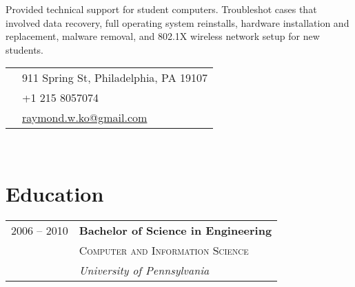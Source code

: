\documentclass[10pt]{article} %
\begin{document}
{\begin{minipage}[t]{0.5\textwidth}
\normalsize{Provided technical support for student computers. Troubleshot cases that involved data recovery, full operating system reinstalls, hardware installation and replacement, malware removal, and 802.1X wireless network setup for new students.}\\


\end{minipage} %
\hfill
\begin{minipage}[t]{0.44\textwidth} %
\vspace{0pt} %


\colorbox{shade}{\textcolor{text1}{
\begin{tabular}{c|p{7cm}}
\raisebox{-4pt}{\textifsymbol{18}} & 911 Spring St, Philadelphia, PA 19107\\ %
\raisebox{-3pt}{\Mobilefone} & +1 215 8057074 \\ %
\raisebox{-1pt}{\Letter} & \href{raymond.w.ko@gmail.com}{raymond.w.ko@gmail.com} \\ %
\end{tabular}
}
}\\[10pt]


\section{Education} 

\begin{tabular}{rl} %


  2006 -- 2010 & \textbf{Bachelor of Science in Engineering}\\
& \textsc{Computer and Information Science} \\
& \textit{University of Pennsylvania} 
	

\end{tabular}
\end{minipage}}
\end{document}
